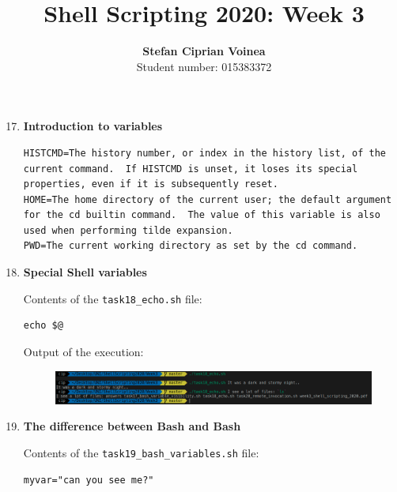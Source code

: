 \documentclass[9pt]{article}
\begin{document}
\title{Shell Scripting 2020: Week 3}
\author{\textbf{Stefan Ciprian Voinea}\\Student number: 015383372}
\maketitle


\begin{enumerate}
	
	\setcounter{enumi}{16}
	
	\item \textbf{Introduction to variables}
	
        \begin{lstlisting}[breaklines=true]
HISTCMD=The history number, or index in the history list, of the    current command.  If HISTCMD is unset, it loses its special properties, even if it is subsequently reset.
HOME=The home directory of the current user; the default argument for the cd builtin command.  The value of this variable is also used when performing tilde expansion.
PWD=The current working directory as set by the cd command.
		\end{lstlisting}
    
    \item \textbf{Special Shell variables}
    
        Contents of the \texttt{task18\_echo.sh} file:
        \begin{lstlisting}
echo $@
        \end{lstlisting}

        Output of the execution:

        \begin{figure}[h!]
            \centering
            \includegraphics[width=\linewidth]{img/18.png}
        \end{figure}

    \item \textbf{The difference between Bash and Bash}
    
        Contents of the \texttt{task19\_bash\_variables.sh} file:
        \begin{lstlisting}
myvar="can you see me?"


\end{lstlisting}
\end{enumerate}
\end{document}
